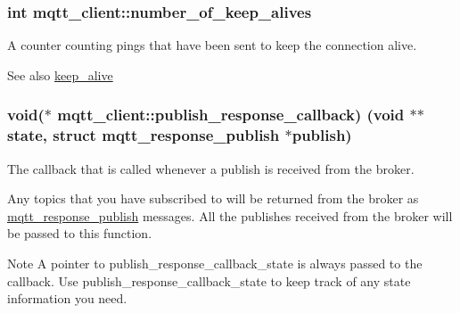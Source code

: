\subsubsection[{\texorpdfstring{number\+\_\+of\+\_\+keep\+\_\+alives}{number_of_keep_alives}}]{\setlength{\rightskip}{0pt plus 5cm}int mqtt\+\_\+client\+::number\+\_\+of\+\_\+keep\+\_\+alives}\hypertarget{structmqtt__client_ac23a02868e9b8c5cd2619b73ee4fcea6}{}\label{structmqtt__client_ac23a02868e9b8c5cd2619b73ee4fcea6}


A counter counting pings that have been sent to keep the connection alive. 

\begin{DoxySeeAlso}{See also}
\hyperlink{structmqtt__client_aff533344a060e58277698039f547147a}{keep\+\_\+alive} 
\end{DoxySeeAlso}
\subsubsection[{\texorpdfstring{publish\+\_\+response\+\_\+callback}{publish_response_callback}}]{\setlength{\rightskip}{0pt plus 5cm}void($\ast$ mqtt\+\_\+client\+::publish\+\_\+response\+\_\+callback) (void $\ast$$\ast$state, struct {\bf mqtt\+\_\+response\+\_\+publish} $\ast$publish)}\hypertarget{structmqtt__client_a21b907c0e4686e4ae9adf8693626c313}{}\label{structmqtt__client_a21b907c0e4686e4ae9adf8693626c313}


The callback that is called whenever a publish is received from the broker. 

Any topics that you have subscribed to will be returned from the broker as \hyperlink{structmqtt__response__publish}{mqtt\+\_\+response\+\_\+publish} messages. All the publishes received from the broker will be passed to this function.

\begin{DoxyNote}{Note}
A pointer to publish\+\_\+response\+\_\+callback\+\_\+state is always passed to the callback. Use publish\+\_\+response\+\_\+callback\+\_\+state to keep track of any state information you need. 
\end{DoxyNote}
